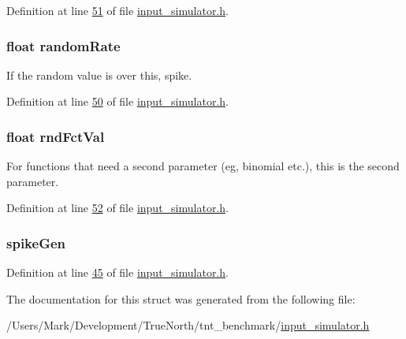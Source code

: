Definition at line \hyperlink{input__simulator_8h_source_l00051}{51} of file \hyperlink{input__simulator_8h_source}{input\+\_\+simulator.\+h}.

\hypertarget{structinput_simulator_state_a1333eb5695ae83d1ffccf24b08bc6288}{}
\subsubsection[{random\+Rate}]{\setlength{\rightskip}{0pt plus 5cm}float random\+Rate}\label{structinput_simulator_state_a1333eb5695ae83d1ffccf24b08bc6288}


If the random value is over this, spike. 



Definition at line \hyperlink{input__simulator_8h_source_l00050}{50} of file \hyperlink{input__simulator_8h_source}{input\+\_\+simulator.\+h}.

\hypertarget{structinput_simulator_state_a0eb8199754a403ccc8eac256f9193a02}{}
\subsubsection[{rnd\+Fct\+Val}]{\setlength{\rightskip}{0pt plus 5cm}float rnd\+Fct\+Val}\label{structinput_simulator_state_a0eb8199754a403ccc8eac256f9193a02}


For functions that need a second parameter (eg, binomial etc.), this is the second parameter. 



Definition at line \hyperlink{input__simulator_8h_source_l00052}{52} of file \hyperlink{input__simulator_8h_source}{input\+\_\+simulator.\+h}.

\hypertarget{structinput_simulator_state_ae40f21a48f3157bcad074f424046ed2c}{}
\subsubsection[{spike\+Gen}]{ spike\+Gen}\label{structinput_simulator_state_ae40f21a48f3157bcad074f424046ed2c}


Definition at line \hyperlink{input__simulator_8h_source_l00045}{45} of file \hyperlink{input__simulator_8h_source}{input\+\_\+simulator.\+h}.



The documentation for this struct was generated from the following file\+:\begin{DoxyCompactItemize}
\item 
/\+Users/\+Mark/\+Development/\+True\+North/tnt\+\_\+benchmark/\hyperlink{input__simulator_8h}{input\+\_\+simulator.\+h}\end{DoxyCompactItemize}
